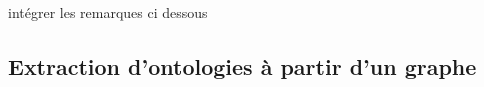 



intégrer les remarques ci dessous


\subsection{Extraction d'ontologies à partir d'un graphe}
\label{subsec:litt-te-graph}



